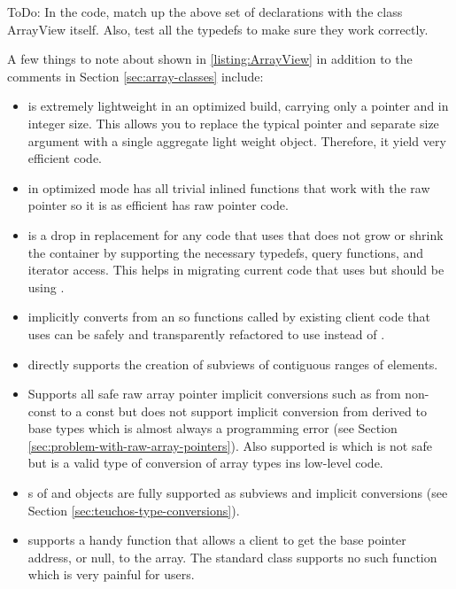 \documentclass[pdf,ps2pdf,11pt]{SANDreport}
\begin{document}
ToDo: In the code, match up the above set of declarations with the
class ArrayView itself.  Also, test all the typedefs to make sure they
work correctly.

A few things to note about {} shown in
{}\ref{listing:ArrayView} in addition to the comments in Section
{}\ref{sec:array-classes} include:

\begin{itemize}

{}\item{}{} is extremely lightweight in an optimized
build, carrying only a pointer and in integer size.  This allows you
to replace the typical pointer and separate size argument with a
single aggregate light weight object.  Therefore, it yield very
efficient code.

{}\item{} in optimized mode has all trivial inlined
functions that work with the raw pointer so it is as efficient has raw
pointer code.

{}\item{}{} is a drop in replacement for any code
that uses {} that does not grow or shrink the
container by supporting the necessary typedefs, query functions, and
iterator access.  This helps in migrating current code that uses
{} but should be using {}.

{}\item{}{} implicitly converts from an
{} so functions called by existing client code
that uses {} can be safely and transparently
refactored to use {} instead of
{}.

{}\item{} directly supports the creation of subviews
of contiguous ranges of elements.

{}\item{} Supports all safe raw array pointer
implicit conversions such as from non-const to a const but does not
support implicit conversion from derived to base types which is almost
always a programming error (see Section
{}\ref{sec:problem-with-raw-array-pointers}).  Also supported is
{} which is not safe but is a valid type of
conversion of array types ins low-level code.

{}\item{}s of {} and
{} objects are fully supported as subviews and
implicit conversions (see Section
{}\ref{sec:teuchos-type-conversions}).

{}\item{} supports a handy {}
function that allows a client to get the base pointer address, or
null, to the array.  The standard {} class
supports no such function which is very painful for users.

\end{itemize}
\end{document}
